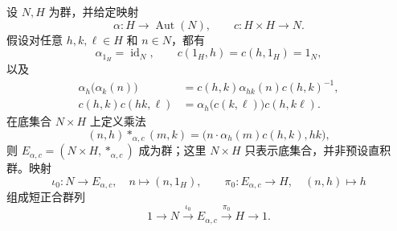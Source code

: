 \begin{proposition}[扩张数据的反向构造]\label{b1:prop:extension-data-construction}
	设 \(N,H\) 为群，并给定映射
	\[
		\alpha:H\longrightarrow\operatorname{Aut}(N), \qquad c:H\times H\longrightarrow N.
	\]
	假设对任意 \(h,k,\ell\in H\) 和 \(n\in N\)，都有
	\[
		\alpha_{1_H}=\operatorname{id}_N, \qquad c(1_H,h)=c(h,1_H)=1_N,
	\]
	以及
	\begin{align*}
		\alpha_h\bigl(\alpha_k(n)\bigr) &=c(h,k)\alpha_{hk}(n)c(h,k)^{-1},\\
		c(h,k)c(hk,\ell) &=\alpha_h\bigl(c(k,\ell)\bigr)c(h,k\ell).
	\end{align*}
	在底集合 \(N\times H\) 上定义乘法
	\[
		(n,h)\ast_{\alpha,c}(m,k) =\bigl(n\cdot\alpha_h(m)c(h,k),hk\bigr),
	\]
	则 \(E_{\alpha,c}=(N\times H,\ast_{\alpha,c})\) 成为群；这里 \(N\times H\) 只表示底集合，并非预设直积群。映射
	\[
		\iota_0:N\longrightarrow E_{\alpha,c}, \quad n\longmapsto(n,1_H), \qquad \pi_0:E_{\alpha,c}\longrightarrow H, \quad(n,h)\longmapsto h
	\]
	组成短正合群列
	\[
		1\longrightarrow N\xrightarrow{\iota_0}E_{\alpha,c} \xrightarrow{\pi_0}H\longrightarrow1.
	\]
\end{proposition}
